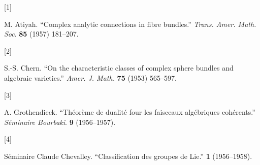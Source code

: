 \documentclass{article}
\newlength{\cslhangindent}
\newlength{\csllabelwidth}
\newenvironment{CSLReferences}[3] %
 {%
  \setlength{\parindent}{0pt}
  \ifodd #1 \everypar{\setlength{\hangindent}{\cslhangindent}}\ignorespaces\fi
  \setlength{\parskip}{0.75\baselineskip}
 }%
 {}
\newcommand{\CSLLeftMargin}[1]{\parbox[t]{\maxof{\widthof{#1}}{\csllabelwidth}}{#1}}
\newcommand{\CSLRightInline}[1]{\parbox[t]{\linewidth}{#1}}
\begin{document}
\hypertarget{refs}{}
\begin{CSLReferences}{0}{0}
\leavevmode\hypertarget{ref-1}{}%
\CSLLeftMargin{{[}1{]} }
\CSLRightInline{M. Atiyah. {``Complex analytic connections in fibre bundles.''} \emph{Trans. Amer. Math. Soc}. \textbf{85} (1957) 181--207.}

\leavevmode\hypertarget{ref-2}{}%
\CSLLeftMargin{{[}2{]} }
\CSLRightInline{S.-S. Chern. {``On the characteristic classes of complex sphere bundles and algebraic varieties.''} \emph{Amer. J. Math.} \textbf{75} (1953) 565--597.}

\leavevmode\hypertarget{ref-3}{}%
\CSLLeftMargin{{[}3{]} }
\CSLRightInline{A. Grothendieck. {``Théorème de dualité four les faisceaux algébriques cohérents.''} \emph{Séminaire Bourbaki}. \textbf{9} (1956--1957).}

\leavevmode\hypertarget{ref-4}{}%
\CSLLeftMargin{{[}4{]} }
\CSLRightInline{Séminaire Claude Chevalley. {``Classification des groupes de {Lie}.''} \textbf{1} (1956--1958).}

\end{CSLReferences}
\end{document}
